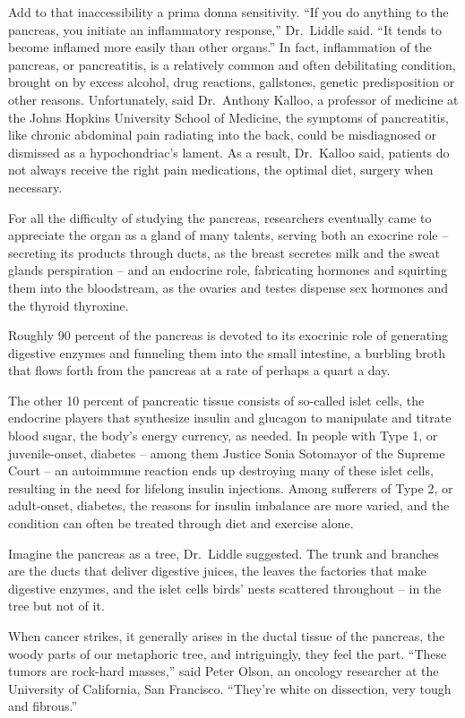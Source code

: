 ﻿\documentclass[12pt]{article}
\begin{document}
Add to that inaccessibility a prima donna sensitivity. ``If you do anything to the pancreas, you
initiate an inflammatory response,'' Dr.~Liddle said. ``It tends to become inflamed\cite{inflamed}
more easily than other organs.'' In fact, inflammation of the pancreas, or pancreatitis, is a
relatively common and often debilitating condition, brought on by excess alcohol, drug reactions,
gallstones, genetic predisposition or other reasons. Unfortunately, said Dr.~Anthony Kalloo, a
professor of medicine at the Johns Hopkins University School of Medicine, the symptoms of
pancreatitis, like chronic abdominal pain radiating into the back, could be misdiagnosed or
dismissed as a hypochondriac's lament. As a result, Dr.~Kalloo said, patients do not always receive
the right pain medications, the optimal diet, surgery when necessary.

For all the difficulty of studying the pancreas, researchers eventually came to appreciate the organ
as a gland of many talents, serving both an exocrine role -- secreting its products through ducts,
as the breast secretes milk and the sweat glands perspiration -- and an endocrine role, fabricating
hormones and squirting them into the bloodstream, as the ovaries and testes dispense sex hormones
and the thyroid thyroxine.

Roughly 90 percent of the pancreas is devoted to its exocrinic role of generating digestive enzymes
and funneling them into the small intestine, a burbling broth that flows forth from the pancreas at
a rate of perhaps a quart a day.

The other 10 percent of pancreatic tissue consists of so-called islet cells, the endocrine players
that synthesize insulin and glucagon to manipulate and titrate blood sugar, the body's energy
currency, as needed. In people with Type 1, or juvenile-onset, diabetes -- among them Justice Sonia
Sotomayor of the Supreme Court -- an autoimmune reaction ends up destroying many of these islet
cells, resulting in the need for lifelong insulin injections. Among sufferers of Type 2, or
adult-onset, diabetes, the reasons for insulin imbalance are more varied, and the condition can
often be treated through diet and exercise alone.

Imagine the pancreas as a tree, Dr.~Liddle suggested. The trunk and branches are the ducts that
deliver digestive juices, the leaves the factories that make digestive enzymes, and the islet cells
birds' nests scattered throughout -- in the tree but not of it.

When cancer strikes, it generally arises in the ductal tissue of the pancreas, the woody parts of
our metaphoric tree, and intriguingly, they feel the part. ``These tumors are rock-hard masses,''
said Peter Olson, an oncology researcher at the University of California, San Francisco. ``They're
white on dissection, very tough and fibrous.''
\end{document}
